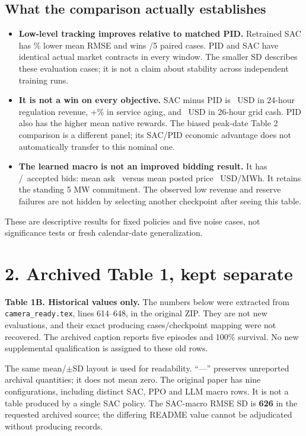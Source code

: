 \documentclass[10pt]{article}
\begin{document}
\subsection*{What the comparison actually establishes}
\begin{itemize}
\setlength{\itemsep}{3pt}
\item \textbf{Low-level tracking improves relative to matched PID.}
Retrained SAC has \SACPIDRMSEGainPct\% lower mean RMSE and wins
\SACPIDRMSEWins/5 paired cases. PID and SAC have identical actual market
contracts in every window. The smaller SD describes these evaluation cases;
it is not a claim about stability across independent training runs.
\item \textbf{It is not a win on every objective.}
SAC minus PID is \SACPIDRevenueDelta~USD in 24-hour regulation revenue,
+\SACPIDAgeIncreasePct\% in service aging, and \SACPIDCashDelta~USD in
26-hour grid cash. PID also has the higher mean native rewards.
The biased peak-date Table 2 comparison is a different panel; its
SAC/PID economic advantage does not automatically transfer to this nominal one.
\item \textbf{The learned macro is not an improved bidding result.}
It has \HighAcceptedBids/\HighBidWindows\ accepted bids:
mean ask \HighMeanBidPrice\ versus mean posted price
\HighMeanPostedPrice~USD/MWh. It retains the standing 5 MW commitment.
The observed low revenue and reserve failures are not hidden by selecting
another checkpoint after seeing this table.
\end{itemize}

These are descriptive results for fixed policies and five noise cases,
not significance tests or fresh calendar-date generalization.

\newpage
\section*{2. Archived Table 1, kept separate}
\textbf{Table 1B. Historical values only.}
The numbers below were extracted from \texttt{camera\_ready.tex},
lines 614--648, in the original ZIP. They are not new evaluations,
and their exact producing cases/checkpoint mapping were not recovered.
The archived caption reports five episodes and 100\% survival.
No new supplemental qualification is assigned to these old rows.
\begin{center}\small
\ArchivedServiceTable
\end{center}

The same mean/$\pm$SD layout is used for readability.
``---'' preserves unreported archival quantities; it does not mean zero.
The original paper has nine configurations, including distinct
SAC, PPO and LLM macro rows. It is not a table produced by a single SAC policy.
The SAC-macro RMSE SD is \textbf{626} in the requested archived source;
the differing README value cannot be adjudicated without producing records.
\end{document}
